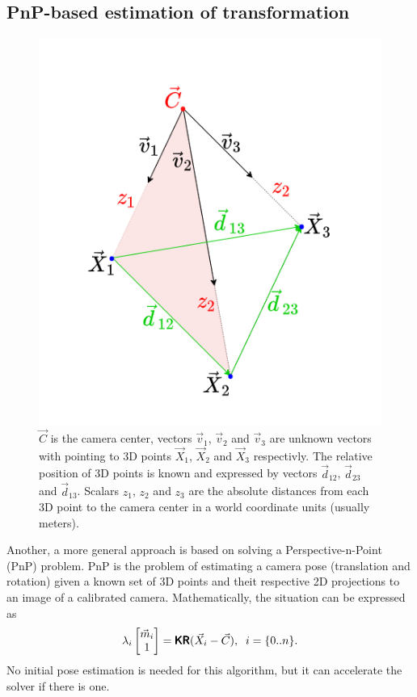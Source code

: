 \subsection{PnP-based estimation of transformation}
\begin{figure}[h]
    \centering
    \includegraphics[width=.4\textwidth]{graphics/p3p.png}
    \caption[Visualization of the P3P problem.]{$\vec{C}$ is the camera center, vectors $\vec{v}_1$, $\vec{v}_2$ and $\vec{v}_3$ are unknown vectors with pointing to 3D points $\vec{X}_1$, $\vec{X}_2$ and $\vec{X}_3$ respectivly. The relative position of 3D points is known and expressed by vectors $\vec{d}_{12}$, $\vec{d}_{23}$ and $\vec{d}_{13}$. Scalars $z_1$, $z_2$ and $z_3$ are the absolute distances from each 3D point to the camera center in a world coordinate units (usually meters).}
    \label{fig:p3p}
\end{figure}

\label{sec:pnp}
Another, a more general approach is based on solving a Perspective-n-Point (PnP) problem.
PnP is the problem of estimating a camera pose (translation and rotation) given a known set of 3D points and theit respective 2D projections to an image of a calibrated camera.
Mathematically, the situation can be expressed as
\begin{equation}
    \label{eq:pnp_intro}
    \lambda_i \begin{bmatrix} \vec{m}_i \\ 1 \end{bmatrix} = \pmb{\mathsf{K}} \pmb{\mathsf{R}} (\vec{X}_i - \vec{C}), \;\; i = \{0..n\}.
\end{equation}
No initial pose estimation is needed for this algorithm, but it can accelerate the solver if there is one.

